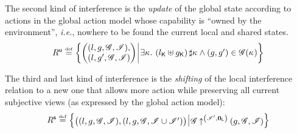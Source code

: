The second kind of interference is the \emph{update} of the global
state according to actions in the global action model whose capability
is ``owned by the environment'', \textit{i.e.}, nowhere to be found
the current local and shared states.
\[	
  \updateR \eqdef
  \left\{
  \begin{array}{@{} l @{\hspace*{2pt}} | @{\hspace*{2pt}} r @{}}
    \left(
    \begin{array}{@{} l @{}}
      (l, g, \gmod, \lmod),\\
      (l, g', \gmod, \lmod)
    \end{array}
    \right)
    &
    \begin{array}{@{} l @{} }
      \begin{array}{@{} l @{}}
	\exsts{\ca{} }\left( \capPart{l} \composeCap \capPart{g} \right) \disjoint \ca{} \land 
	(g, g') \in \gmod(\ca{}) \\
      \end{array}	
    \end{array}
  \end{array}
  \right\}
\]	

The third and last kind of interference is the \emph{shifting} of the
local interference relation to a new one that allows more action while
preserving all current subjective views (as expressed by the global
action model):
\[
  \shiftR \eqdef
  \left\{
  \begin{array}{@{} l @{\hspace*{2pt}} | @{\hspace*{2pt}} r @{}}
    \left(
    \begin{array}{@{} l @{}}
      (l, g, \gmod, \lmod),
      \left( l, g, \gmod, \lmod \cup \lmod'  \right)
    \end{array}
    \right)
    &
    \expandsAM{\gmod}{\lmod'}{\unitL}{g}{\gmod}{\lmod}
  \end{array}
  \right\}
\]


